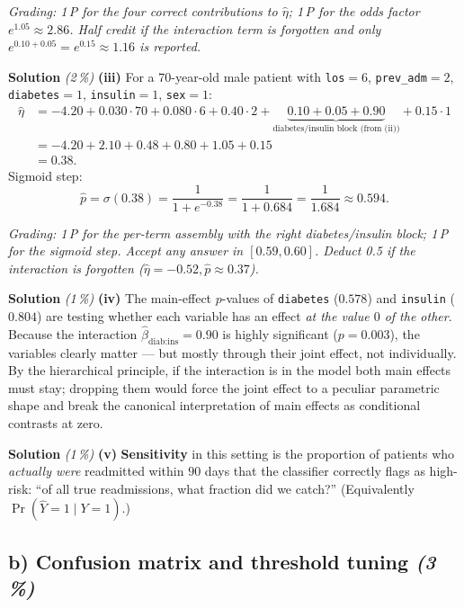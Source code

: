 \documentclass[11pt,a4paper]{article}
\newcommand{\subpoints}[1]{\textit{(#1\,\%)}}
\newcommand{\sol}{\noindent\textbf{Solution}}
\begin{document}
\noindent\emph{Grading: 1\,P for the four correct contributions to $\hat\eta$; 1\,P for the odds
factor $e^{1.05}\approx 2.86$. Half credit if the interaction term is forgotten and only
$e^{0.10+0.05}=e^{0.15}\approx 1.16$ is reported.}

\medskip
\sol{} \subpoints{2} \textbf{(iii)} For a $70$-year-old male patient with \texttt{los}$=6$,
\texttt{prev\_adm}$=2$, \texttt{diabetes}$=1$, \texttt{insulin}$=1$, \texttt{sex}$=1$:
\begin{align*}
\hat\eta &= -4.20
   + 0.030\cdot 70
   + 0.080\cdot 6
   + 0.40\cdot 2
   + \underbrace{0.10 + 0.05 + 0.90}_{\text{diabetes/insulin block (from (ii))}}
   + 0.15\cdot 1 \\[2pt]
&= -4.20 + 2.10 + 0.48 + 0.80 + 1.05 + 0.15 \\[2pt]
&= \boxed{0.38}.
\end{align*}
Sigmoid step:
$$\hat p = \sigma(0.38) = \frac{1}{1+e^{-0.38}} = \frac{1}{1+0.684} = \frac{1}{1.684} \approx \boxed{0.594}.$$

\noindent\emph{Grading: 1\,P for the per-term assembly with the right diabetes/insulin block; 1\,P
for the sigmoid step. Accept any answer in $[0.59, 0.60]$. Deduct 0.5 if the interaction is
forgotten ($\hat\eta=-0.52, \hat p\approx 0.37$).}

\medskip
\sol{} \subpoints{1} \textbf{(iv)} The main-effect $p$-values of \texttt{diabetes} ($0.578$) and
\texttt{insulin} ($0.804$) are testing whether each variable has an effect \emph{at the value $0$
of the other}. Because the interaction $\hat\beta_{\text{diab:ins}} = 0.90$ is highly significant
($p=0.003$), the variables clearly matter --- but mostly through their joint effect, not
individually. By the hierarchical principle, if the interaction is in the model both main effects
must stay; dropping them would force the joint effect to a peculiar parametric shape and break
the canonical interpretation of main effects as conditional contrasts at zero.

\medskip
\sol{} \subpoints{1} \textbf{(v)} \textbf{Sensitivity} in this setting is the proportion of
patients who \emph{actually were} readmitted within $90$ days that the classifier correctly flags
as high-risk: ``of all true readmissions, what fraction did we catch?'' (Equivalently $\Pr(\hat
Y=1 \mid Y=1)$.)

\subsection*{b) Confusion matrix and threshold tuning \subpoints{3}}
\end{document}
